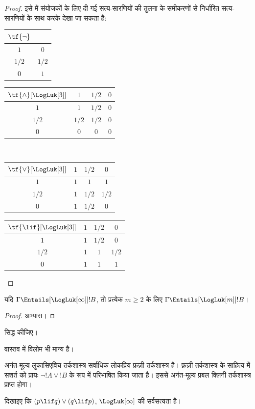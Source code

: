 \documentclass[../../../include/open-logic-section]{subfiles}
\begin{document}
\begin{proof}
  इसे  में संयोजकों के लिए दी गई
  सत्य-सारणियों की तुलना  के समीकरणों से निर्धारित
  सत्य-सारणियों के साथ करके देखा जा सकता है:
  \begin{center}
    \begin{tabular}{c|c} 
      $\tf{\lnot}$ & \\ 
      \hline  
      $1$ & $0$ \\ 
      $1/2$ & $1/2$ \\
      $0$ & $1$ 
    \end{tabular}
    \quad
    \begin{tabular}{c|ccc} 
      $\tf{\land}[\LogLuk[3]]$ & $1$ & $1/2$ & $0$ \\ 
      \hline 
      $1$ & $1$ & $1/2$ & $0$ \\ 
      $1/2$ & $1/2$ & $1/2$ & $0$\\ 
      $0$ & $0$ & $0$ & $0$ 
    \end{tabular}
    \\[2ex]
    \begin{tabular}{c|ccc} 
      $\tf{\lor}[\LogLuk[3]]$ & $1$ & $1/2$ & $0$ \\ 
      \hline 
      $1$ & $1$ & $1$ & $1$ \\ 
      $1/2$ & $1$ & $1/2$ & $1/2$ \\
      $0$ & $1$ & $1/2$ & $0$ 
    \end{tabular}
    \quad
    \begin{tabular}{c|ccc} 
      $\tf{\lif}[\LogLuk[3]]$ & $1$ & $1/2$ & $0$ \\ 
      \hline 
      $1$ & $1$ & $1/2$ & $0$ \\ 
      $1/2$ & $1$ & $1$ & $1/2$  \\ 
      $0$ & $1$ & $1$ & $1$ 
    \end{tabular}
  \end{center} 
\end{proof}

\begin{prop}
  यदि $\Gamma \Entails[\LogLuk[\infty]] !B$, तो प्रत्येक $m \ge 2$ के लिए
  $\Gamma \Entails[\LogLuk[m]] !B$।
\end{prop}

\begin{proof}
  अभ्यास।
\end{proof}

\begin{prob}
   सिद्ध कीजिए।
\end{prob}

वास्तव में विलोम भी मान्य है।

अनंत-मूल्य लुकासिएविच तर्कशास्त्र सर्वाधिक लोकप्रिय फ़ज़ी तर्कशास्त्र है।
फ़ज़ी तर्कशास्त्र के साहित्य में सशर्त को प्रायः $\lnot !A \lor !B$ के रूप
में परिभाषित किया जाता है। इससे अनंत-मूल्य प्रबल क्लिनी तर्कशास्त्र प्राप्त
होगा।

\begin{prob}
  दिखाइए कि $(p \lif q) \lor (q \lif p)$, $\LogLuk[\infty]$ की
  सर्वसत्यता है।
\end{prob}
\end{document}
